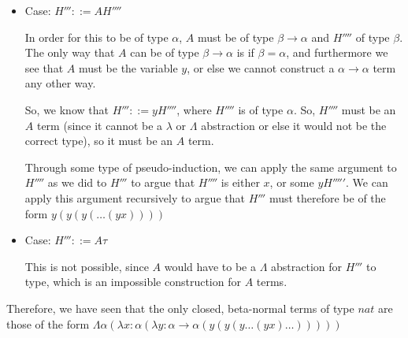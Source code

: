 \documentclass[12pt]{article}
\begin{document}
\begin{enumerate}[label=(\alph*)]
\begin{itemize}
\begin{itemize}
          \item
            Case: $H''' ::= A H''''$

            In order for this to be of type $\alpha$, $A$ must be of type $\beta \rightarrow \alpha$ and $H''''$ of type $\beta$. The only way that $A$ can be of type $\beta \rightarrow \alpha$ is if $\beta = \alpha$, and furthermore we see that $A$ must be the variable $y$, or else we cannot construct a $\alpha \rightarrow \alpha$ term any other way.

            So, we know that $H''' ::= y H''''$, where $H''''$ is of type $\alpha$. So, $H''''$ must be an $A$ term (since it cannot be a $\lambda$ or $\Lambda$ abstraction or else it would not be the correct type), so it must be an $A$ term.

            Through some type of pseudo-induction, we can apply the same argument to $H''''$ as we did to $H'''$ to argue that $H''''$ is either $x$, or some $y H'''''$. We can apply this argument recursively to argue that $H'''$ must therefore be of the form $y (y (y (\ldots ( y x))))$

          \item
            Case: $H''' ::= A \tau$

            This is not possible, since $A$ would have to be a $\Lambda$ abstraction for $H'''$ to type, which is an impossible construction for $A$ terms.
        \end{itemize}
    \end{itemize}

    Therefore, we have seen that the only closed, beta-normal terms of type $nat$ are those of the form $\Lambda \alpha (\lambda x : \alpha(\lambda y: \alpha\rightarrow \alpha (y (y (y \ldots ( y x)\ldots)))))$

        
\end{enumerate}
\end{document}
